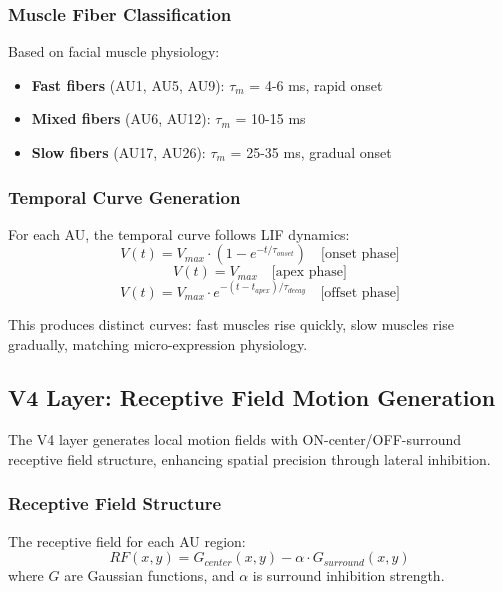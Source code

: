 \documentclass[preprint,12pt]{elsarticle}
\begin{document}
\subsubsection{Muscle Fiber Classification}

Based on facial muscle physiology:
\begin{itemize}
\item \textbf{Fast fibers} (AU1, AU5, AU9): $\tau_m$ = 4-6 ms, rapid onset
\item \textbf{Mixed fibers} (AU6, AU12): $\tau_m$ = 10-15 ms
\item \textbf{Slow fibers} (AU17, AU26): $\tau_m$ = 25-35 ms, gradual onset
\end{itemize}

\subsubsection{Temporal Curve Generation}

For each AU, the temporal curve follows LIF dynamics:
\begin{equation}
V(t) = V_{max} \cdot (1 - e^{-t/\tau_{onset}}) \quad \text{[onset phase]}
\end{equation}
\begin{equation}
V(t) = V_{max} \quad \text{[apex phase]}
\end{equation}
\begin{equation}
V(t) = V_{max} \cdot e^{-(t-t_{apex})/\tau_{decay}} \quad \text{[offset phase]}
\end{equation}

This produces distinct curves: fast muscles rise quickly, slow muscles
rise gradually, matching micro-expression physiology.

\subsection{V4 Layer: Receptive Field Motion Generation}
\label{sec:v4}

The V4 layer generates local motion fields with ON-center/OFF-surround
receptive field structure, enhancing spatial precision through lateral inhibition.

\subsubsection{Receptive Field Structure}

The receptive field for each AU region:
\begin{equation}
RF(x,y) = G_{center}(x,y) - \alpha \cdot G_{surround}(x,y)
\end{equation}
where $G$ are Gaussian functions, and $\alpha$ is surround inhibition strength.
\end{document}
